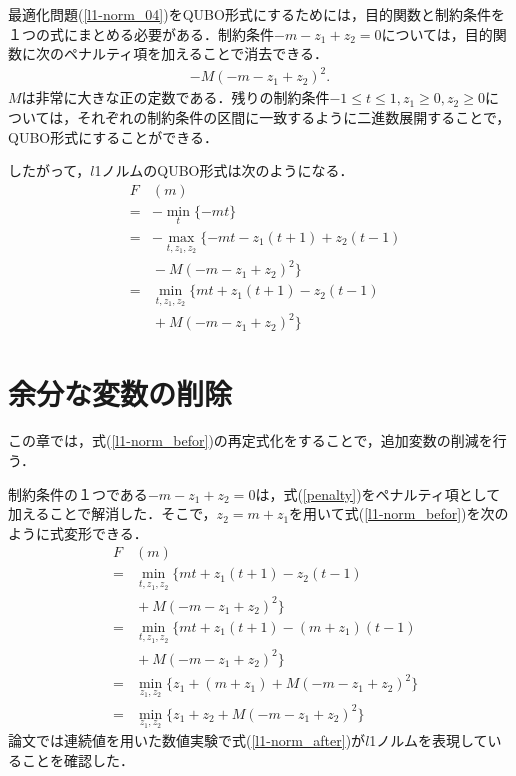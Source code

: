 \documentclass[technicalreport]{ieicej}
\begin{document}
最適化問題(\ref{l1-norm_04})をQUBO形式にするためには，目的関数と制約条件を１つの式にまとめる必要がある．制約条件$-m-z_{1}+z_{2}=0$については，目的関数に次のペナルティ項を加えることで消去できる．
\begin{eqnarray}
  -M(-m-z_{1}+z_{2})^{2}. \label{penalty}
\end{eqnarray}
$M$は非常に大きな正の定数である．残りの制約条件$-1\leq t\leq 1,z_{1}\geq 0,z_{2}\geq 0$については，それぞれの制約条件の区間に一致するように二進数展開することで，QUBO形式にすることができる．

したがって，$l$1ノルムのQUBO形式は次のようになる．
\begin{eqnarray}
  &F&(m) \nonumber \\
  &=& -\min_{t}{\{-mt\}} \nonumber \\
  &=& -\max_{t,z_{1},z_{2}}{\{-mt-z_{1}(t+1)+z_{2}(t-1)} \nonumber \\
  & & \mbox{}-M(-m-z_{1}+z_{2})^{2}\} \nonumber \\
  &=& \min_{t,z_{1},z_{2}}{\{mt+z_{1}(t+1)-z_{2}(t-1)} \nonumber \\
  & & \mbox{}+M(-m-z_{1}+z_{2})^{2}\} \label{l1-norm_befor}
\end{eqnarray}

\section{余分な変数の削除}
この章では，式(\ref{l1-norm_befor})の再定式化をすることで，追加変数の削減を行う．

制約条件の１つである$-m-z_{1}+z_{2}=0$は，式(\ref{penalty})をペナルティ項として加えることで解消した．そこで，$z_{2}=m+z_{1}$を用いて式(\ref{l1-norm_befor})を次のように式変形できる．
\begin{eqnarray}
  &F&(m) \nonumber \\
  &=& \min_{t,z_{1},z_{2}}{\{mt+z_{1}(t+1)-z_{2}(t-1)} \nonumber \\
  & & \mbox{}+M(-m-z_{1}+z_{2})^{2}\} \nonumber \\
  &=& \min_{t,z_{1},z_{2}}{\{mt+z_{1}(t+1)-(m+z_{1})(t-1)} \nonumber \\
  & & \mbox{}+M(-m-z_{1}+z_{2})^{2}\} \nonumber \\
  &=& \min_{z_{1},z_{2}}{\{z_{1}+(m+z_{1})+M(-m-z_{1}+z_{2})^{2}\}} \nonumber \\
  &=& \min_{z_{1},z_{2}}{\{z_{1}+z_{2}+M(-m-z_{1}+z_{2})^{2}\}} \label{l1-norm_after}
\end{eqnarray}
論文\cite{l1-norm}では連続値を用いた数値実験で式(\ref{l1-norm_after})が$l$1ノルムを表現していることを確認した．
\end{document}
